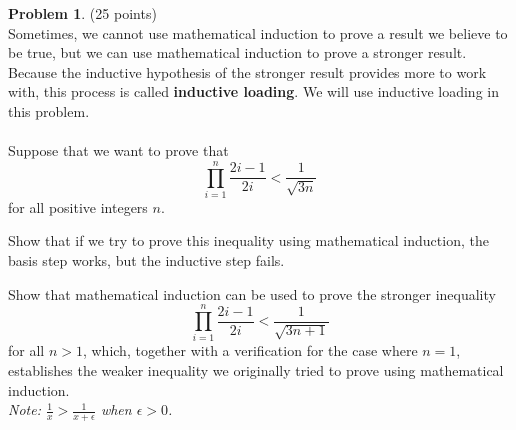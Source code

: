 \documentclass{article}
\theoremstyle{definition}
\newtheorem{problem}{Problem}
\begin{document}
\begin{problem} (25 points)\\
Sometimes, we cannot use mathematical induction to prove a result we believe to be true, but we can use mathematical induction to prove a stronger result.  Because the inductive hypothesis of the stronger result provides more to work with, this process is called \textbf{inductive loading}. We will use inductive loading in this problem.\\
\\
Suppose that we want to prove that $$\prod_{i=1}^n \frac{2i-1}{2i} < \frac{1}{\sqrt{3n}}$$ for all positive integers $n$.
\begin{compactenum}
\renewcommand{\theenumi}{\alph{enumi}}
\item Show that if we try to prove this inequality using mathematical induction, the basis step works, but the inductive step fails.
\item Show that mathematical induction can be used to prove the stronger inequality $$\prod_{i=1}^n \frac{2i-1}{2i} < \frac{1}{\sqrt{3n+1}}$$ for all $n>1$, which, together with a verification for the case where $n=1$, establishes the weaker inequality we originally tried to prove using mathematical induction.\\
\textit{Note: $\displaystyle \frac{1}{x} > \frac{1}{x+\epsilon}$ when $\epsilon > 0$.}
\end{compactenum}
\end{problem}
\end{document}
